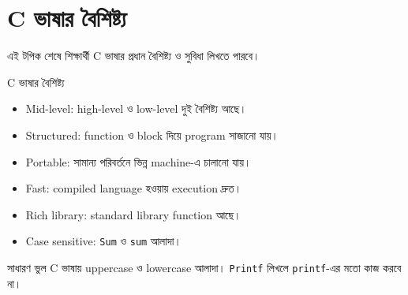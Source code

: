 \section{C ভাষার বৈশিষ্ট্য}

\begin{learningbox}
এই টপিক শেষে শিক্ষার্থী C ভাষার প্রধান বৈশিষ্ট্য ও সুবিধা লিখতে পারবে।
\end{learningbox}

\begin{keypointbox}{C ভাষার বৈশিষ্ট্য}
\begin{itemize}
\item Mid-level: high-level ও low-level দুই বৈশিষ্ট্য আছে।
\item Structured: function ও block দিয়ে program সাজানো যায়।
\item Portable: সামান্য পরিবর্তনে ভিন্ন machine-এ চালানো যায়।
\item Fast: compiled language হওয়ায় execution দ্রুত।
\item Rich library: standard library function আছে।
\item Case sensitive: \texttt{Sum} ও \texttt{sum} আলাদা।
\end{itemize}
\end{keypointbox}

\begin{mistakebox}{সাধারণ ভুল}
C ভাষায় uppercase ও lowercase আলাদা। \texttt{Printf} লিখলে \texttt{printf}-এর মতো কাজ করবে না।
\end{mistakebox}
